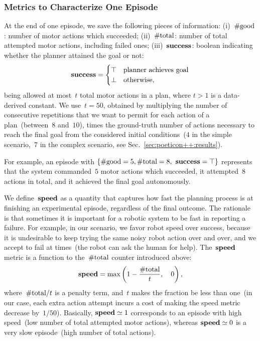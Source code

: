 \subsubsection{Metrics to Characterize One Episode}
At the end of one episode, we save the following pieces of information:
(i)~$\text{\#good}$: number of motor actions which succeeded;
(ii)~$\text{\#total}$: number of total attempted motor actions, including failed ones;
(iii)~$\textbf{\ensuremath{\text{success}}}$: boolean indicating whether the planner attained the goal or not:
\begin{equation*}
\textbf{\ensuremath{\text{success}}} = \begin{cases}
              \top & \text{planner achieves goal} \\
              \bot & \text{otherwise,}
              \end{cases}
\end{equation*}
being allowed at most~$t$ total motor actions in a plan, where $t>1$ is a data-derived constant.
We use~$t=50$, obtained by multiplying the number of consecutive repetitions that we want to permit for each action of a plan~(between~$8$ and~$10$), times the ground-truth number of actions necessary to reach the final goal from the considered initial conditions~($4$ in the simple scenario,~$7$ in the complex scenario, see Sec.~\ref{sec:poeticon++:results}).

For example, an episode with $\{ \text{\#good}=5, \text{\#total}=8,$ $\textbf{\ensuremath{\text{success}}}=\top \}$ represents that the system commanded~$5$ motor actions which succeeded, it attempted~$8$ actions in total, and it achieved the final goal autonomously.

We define~$\textbf{\ensuremath{\text{speed}}}$ as a quantity that captures how fast the planning process is at finishing an experimental episode, regardless of the final outcome.
The rationale is that sometimes it is important for a robotic system to be fast in reporting a failure.
For example, in our scenario, we favor robot speed over success, because it is undesirable to keep trying the same noisy robot action over and over, and we accept to fail at times~(the robot can ask the human for help).
The~$\textbf{\ensuremath{\text{speed}}}$ metric is a function to the~$\text{\#total}$ counter introduced above:
\begin{equation} \label{eq:speed_metric}
\textbf{\ensuremath{\text{speed}}} = \max \left( 1 - \frac{\text{\#total}}{t}, \quad 0 \right),
\end{equation}
where~$\text{\#total}/t$ is a penalty term, and~$t$ makes the fraction be less than one~(in our case, each extra action attempt incurs a cost of making the speed metric decrease by~$1/50$).
Basically, $\textbf{\ensuremath{\text{speed}}} \simeq 1$ corresponds to an episode with high speed~(low number of total attempted motor actions), whereas $\textbf{\ensuremath{\text{speed}}} \simeq 0$ is a very slow episode~(high number of total actions).

